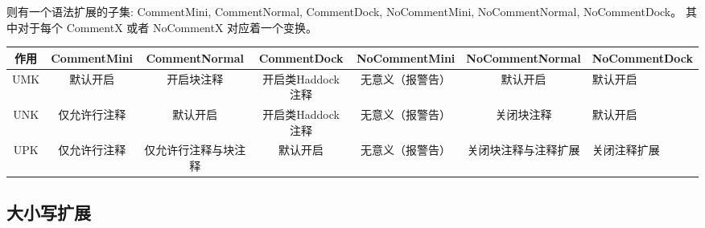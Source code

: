 \documentclass{ctexart}
\begin{document}
则有一个语法扩展的子集: CommentMini, CommentNormal, CommentDock, NoCommentMini, NoCommentNormal, NoCommentDock。
其中对于每个 CommentX 或者 NoCommentX 对应着一个变换。

\begin{tabular}{|c|c|c|c|c|c|}
  \hline 作用 & CommentMini & CommentNormal & CommentDock & NoCommentMini & NoCommentNormal & NoCommentDock \\
  \hline UMK & 默认开启 & 开启块注释 & 开启类Haddock注释 & 无意义（报警告）& 默认开启 & 默认开启 \\ 
  \hline UNK & 仅允许行注释 & 默认开启 & 开启类Haddock注释 & 无意义（报警告） & 关闭块注释 & 默认开启 \\
  \hline UPK & 仅允许行注释 & 仅允许行注释与块注释 & 默认开启 & 无意义（报警告） & 关闭块注释与注释扩展 & 关闭注释扩展 \\
  \hline 
\end{tabular}

\subsection{大小写扩展}
\label{sec:langexte:lettercase}
\end{document}
